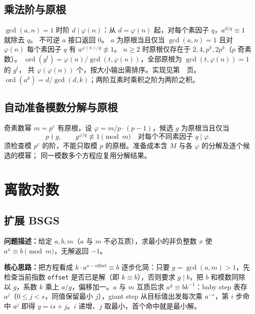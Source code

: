 \subsection{乘法阶与原根}\label{knowledge-primitive-root}
$\gcd(a,n)=1$ 时阶 $d\mid\varphi(n)$：从 $d=\varphi(n)$ 起，对每个素因子 $q$，$a^{d/q}\equiv1$ 就除去 $q$。
不可逆 $a$ 接口返回 0。
$a$ 为原根当且仅当 $\gcd(a,n)=1$ 且对 $\varphi(n)$ 每个素因子 $q$ 有 $a^{\varphi(n)/q}\not\equiv1$。
$n\ge2$ 时原根仅存在于 $2,4,p^k,2p^k$（$p$ 奇素数）。
$\operatorname{ord}(g^t)=\varphi(n)/\gcd(t,\varphi(n))$，全部原根为 $\gcd(t,\varphi(n))=1$ 的 $g^t$，
共 $\varphi(\varphi(n))$ 个，按大小输出需排序。实现见第~\pageref{compact-PrimitiveRoot}~页。
$\operatorname{ord}(a^k)=d/\gcd(d,k)$；两阶互素时乘积之阶为两阶之积。



\subsection{自动准备模数分解与原根}\label{knowledge-residue-setup}
奇素数幂 $m=p^e$ 有原根，设 $\varphi=m/p\cdot(p-1)$，候选 $g$ 为原根当且仅当
\[
p\nmid g,\qquad g^{\varphi/q}\not\equiv1\pmod m
\quad\text{对每个不同素因子 }q\mid\varphi.
\]
须检查模 $p^e$ 的阶，不能只取模 $p$ 的原根。准备成本含 $M$ 与各 $\varphi$ 的分解及逐个候选的模幂；
同一模数多个方程应复用分解结果。


\Needspace{180pt}

\section{离散对数}

\subsection{扩展 BSGS}\label{compact-DiscreteLog}

\noindent\textbf{问题描述：}\allowbreak 给定 $a,b,m$（$a$ 与 $m$ 不必互质），求最小的非负整数 $x$ 使 $a^x\equiv b\pmod m$，无解返回 $-1$。

\textbf{核心思路：}\allowbreak 把方程看成 $k\cdot a^{x-\mathrm{offset}}\equiv b$ 逐步化简：只要 $g=\gcd(a,m)>1$，先检查当前指数 \texttt{offset} 是否已是解（即 $k\equiv b$），否则要求 $g\mid b$，把 $b$ 和模数同除以 $g$，系数 $k$ 乘上 $a/g$，偏移加一。$a$ 与 $m$ 互质后求 $a^y\equiv bk^{-1}$：baby step 表存 $a^j$（$0\le j<s$，同值保留最小 $j$），giant step 从目标值出发每次乘 $a^{-s}$，第 $i$ 步命中 $a^j$ 即得 $y=is+j$。$i$ 递增、$j$ 取最小，首个命中就是最小解。

